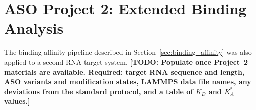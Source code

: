 \section{ASO Project 2: Extended Binding Analysis}
\label{sec:project2}

The binding affinity pipeline described in
Section~\ref{sec:binding_affinity} was also applied to a second RNA
target system.
\textbf{[TODO: Populate once Project~2 materials are available.
Required: target RNA sequence and length, ASO variants and modification
states, LAMMPS data file names, any deviations from the standard
protocol, and a table of $K_D$ and $K_A^*$ values.]}